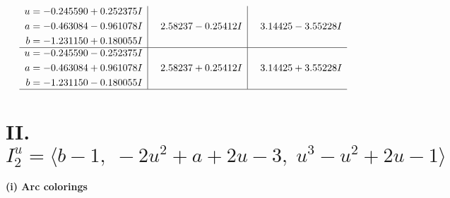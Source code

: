 \documentclass[1p]{elsarticle_modified}
\theoremstyle{definition}
\begin{document}
$$\begin{array}{c|c|c}
\begin{aligned}
u &= -0.245590 + 0.252375 I \\
a &= -0.463084 - 0.961078 I \\
b &= -1.231150 + 0.180055 I\end{aligned}
 & \phantom{-}2.58237 - 0.25412 I & \phantom{-}3.14425 - 3.55228 I \\ \hline\begin{aligned}
u &= -0.245590 - 0.252375 I \\
a &= -0.463084 + 0.961078 I \\
b &= -1.231150 - 0.180055 I\end{aligned}
 & \phantom{-}2.58237 + 0.25412 I & \phantom{-}3.14425 + 3.55228 I\\
 \hline 
 \end{array}$$\newpage\newpage\renewcommand{\arraystretch}{1}
\centering \section*{II. $I^u_{2}= \langle b-1,\;-2 u^2+a+2 u-3,\;u^3- u^2+2 u-1 \rangle$}
\flushleft \textbf{(i) Arc colorings}\\
\end{document}
